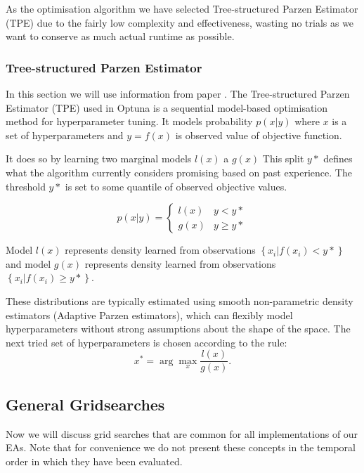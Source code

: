 As the optimisation algorithm we have selected Tree-structured Parzen Estimator (TPE) due to the fairly low complexity and effectiveness, wasting no trials as we want to conserve as much actual runtime as possible.
\subsubsection{Tree-structured Parzen Estimator}
In this section we will use information from paper \cite{bergstra2011algorithms}.
The Tree-structured Parzen Estimator (TPE) used in Optuna is a sequential model-based optimisation method for hyperparameter tuning. It models probability $p(x|y)$ where $x$ is a set of hyperparameters and $y=f(x)$ is observed value of objective function.  

It does so by learning two marginal models $l(x)$ a $g(x)$
This split $y*$ defines what the algorithm currently considers promising based on past experience. The threshold $y*$ is set to some quantile of observed objective values.

$$p(x|y) = \begin{cases}
	l(x) &  y < y* \\
	g(x)   & y \geq y*
\end{cases}$$

Model $l(x)$ represents density learned from observations $\left\lbrace x_i | f(x_i) < y*\right\rbrace$  and model $g(x)$ represents density learned from observations $\left\lbrace x_i | f(x_i) \geq y*\right\rbrace$.

These distributions are typically estimated using smooth non-parametric density estimators (Adaptive Parzen estimators), which can flexibly model hyperparameters without strong assumptions about the shape of the space.
The next tried set of hyperparameters is chosen according to the rule:
\[x^* = \arg\max_x \frac{l(x)}{g(x)}.\]

\newpage
\subsection{General Gridsearches}
Now we will discuss grid searches that are common for all implementations of our EAs. Note that for convenience we do not present these concepts in the temporal order in which they have been evaluated. 

